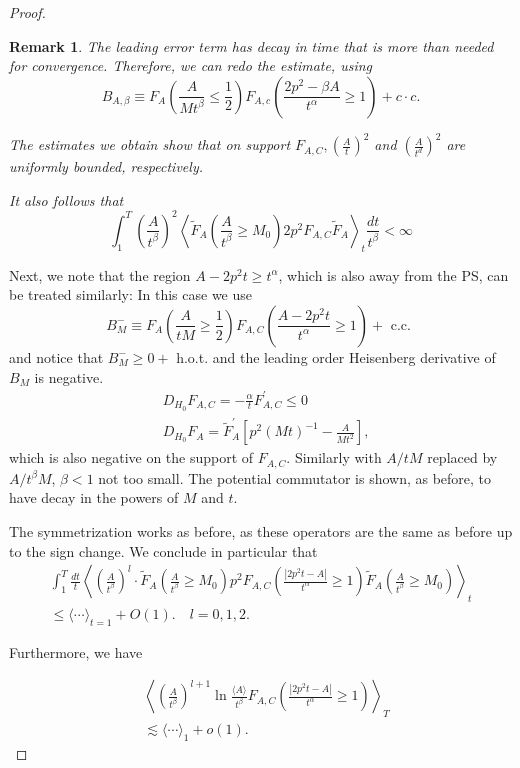 \documentclass[11pt]{article}
\newtheorem{remark}[theorem]{Remark}
\begin{document}
\begin{proof}
\begin{remark}

The leading error term has decay in time that is more than needed for convergence. Therefore, we can redo the estimate, using
$$
B_{A, \beta} \equiv F_{A}\left(\frac{A}{Mt^{\beta}} \leqslant \frac{1}{2}\right) F_{A, c}\left(\frac{2 p^{2}-\beta A}{t^{\alpha}} \geqslant 1\right)+c \cdot c .
$$

The estimates we obtain show that on support $F_{A, C},  \left(\frac{A}{t}\right)^{2}$ and $\left(\frac{A}{t^{d}}\right)^{2}$ are uniformly bounded, respectively.

It also follows that
$$
\int_{1}^{T}\left(\frac{A}{t^{\beta}}\right)^{2}\left\langle\tilde{F}_{A}\left(\frac{A}{t^{\beta}} \geqslant M_{0}\right) 2 p^{2} F_{A, C} \tilde{F}_{A}\right\rangle_{t} \frac{d t}{t^{\beta}}<\infty
$$
\end{remark}

Next, we note that the region $A-2 p^{2} t \geqslant t^{\alpha}$, which is also away from the PS, can be treated similarly:
In this case we use
$$
B_{M}^{-} \equiv F_{A}\left(\frac{A}{t M} \geqslant \frac{1}{2}\right) F_{A,C}\left(\frac{A-2 p^{2} t}{t^{\alpha}} \geqslant 1\right)+\text { c.c. }
$$
and notice that $B_{M}^{-} \geqslant 0+$ h.o.t. and the leading order Heisenberg derivative of $B_{M}$ is negative.
$$
\begin{aligned}
& D_{H_{0}} F_{A, C}=-\frac{\alpha}{t} F_{A, C}^{\prime} \leqslant 0 \\
& D_{H_{0}} F_{A}=\tilde{F}_{A}^{\prime}\left[p^{2}(Mt )^{-1}-\frac{A}{Mt^{2}}\right],
\end{aligned}
$$
which is also negative on the support of $F_{A, C}$. Similarly with $A / t M$ replaced by $A / t^{\beta} M$, $\beta<1$ not too small.
The potential commutator is shown, as before, to have decay in the powers of $M$ and $t$.

The symmetrization works as before, as these operators are the same as before up to the sign change.
We conclude in particular that
$$
\begin{gathered}
\int_{1}^{T} \frac{d t}{t}\left\langle\left(\frac{A}{t^{\beta}}\right)^{l} \cdot \tilde{F}_{A}\left(\frac{A}{t^{\beta}} \geqslant M_{0}\right) p^{2} F_{A, C}\left(\frac{\left|2 p^{2} t-A\right|}{t^{\alpha}} \geqslant 1\right) \tilde{F}_{A}\left(\frac{A}{t^{\beta}} \geqslant M_{0}\right)\right\rangle_{t} \\
\leqslant\langle\cdots\rangle_{t=1}+O(1) . \quad l=0,1,2 .
\end{gathered}
$$

Furthermore, we have

\begin{align}
& \left\langle\left(\frac{A}{t^{\beta}}\right)^{l+1} \ln \frac{\langle A\rangle}{t^{\beta}} F_{A, C}\left(\frac{\left|2 p^{2} t-A\right|}{t^{\alpha}} \geqslant 1\right)\right\rangle_{T} \\
& \lesssim\langle\cdots\rangle_{1}+o(1) .
\end{align}

\end{proof}
\end{document}
